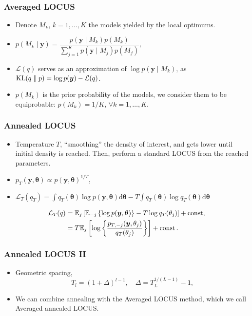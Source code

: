 \documentclass{beamer}
\DeclareMathOperator*{\KL}{{\rm KL}}
\DeclareMathOperator*{\const}{{\rm const}}
\begin{document}
\begin{frame}
\frametitle{Averaged LOCUS}
\begin{itemize}
\item Denote $M_k$, $k= 1,\ldots, K$ the models yielded by the local optimums.
\item $p(M_k \mid \boldsymbol{y}) = \dfrac{p(\boldsymbol{y} \mid M_k)p(M_k)}{\sum_{j=1}^{K}p(\boldsymbol{y}\mid M_j)p(M_j)},$
\item $\mathcal{L}(q)$ serves as an approximation of $\log p(\boldsymbol{y} \mid M_k)$, as $\KL(q\parallel p) = \log p(\boldsymbol{y}) - \mathcal{L}(q)$.
\item $p(M_k)$ is the prior probability of the models, we consider them to be equiprobable: $p(M_k) = 1/K$, $\forall k = 1,\ldots,K$.
\end{itemize}
\end{frame}

\begin{frame}
\frametitle{Annealed LOCUS}
\begin{itemize}
\item Temperature $T$, ``smoothing'' the density of interest, and gets lower until initial density is reached. Then, perform a standard LOCUS from the reached parameters.
\item $p_T(\boldsymbol{y},\boldsymbol{\theta}) \propto p(\boldsymbol{y},\boldsymbol{\theta})^{1/T}$,
\item $\mathcal{L}_T(q_T) = \int q_T(\boldsymbol{\theta}) \log p(\boldsymbol{y},\boldsymbol{\theta})\mathrm{d}\boldsymbol{\theta} - T \int q_T(\boldsymbol{\theta}) \log q_T(\boldsymbol{\theta}) \mathrm{d}\boldsymbol{\theta}$

\end{itemize}
\begin{align*}
\mathcal{L}_T(q) &= \mathbb{E}_j\left[\mathbb{E}_{-j}\left\lbrace \log p(\boldsymbol{y},\boldsymbol{\theta})\right\rbrace - T \log q_T(\theta_j)\right]+ \const,\\
&= T\mathbb{E}_j\left[\log\left\lbrace\frac{p_{T, -j}(\boldsymbol{y}, \theta_j)}{q_T(\theta_j)}\right\rbrace\right] + \const.
\end{align*}

\end{frame}

\begin{frame}
\frametitle{Annealed LOCUS II}
\begin{itemize}
\item Geometric spacing,
\begin{equation*}
T_l = (1 + \Delta)^{l-1},\quad \Delta = T_L^{1/(L-1)}-1,
\end{equation*}

\item We can combine annealing with the Averaged LOCUS method, which we call Averaged annealed LOCUS.
\end{itemize}
\end{frame}
\end{document}
